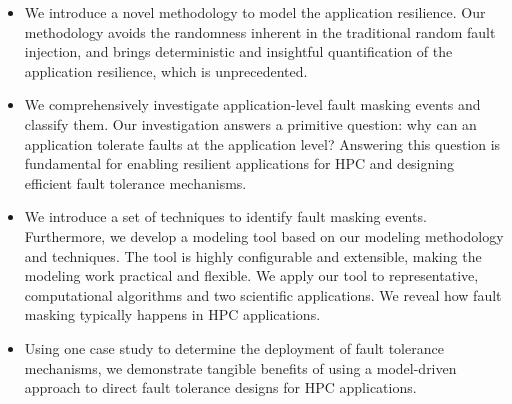 \begin{itemize}
\item
We introduce a novel methodology to model the application resilience.
Our methodology avoids the randomness inherent in the traditional random fault injection,
and brings deterministic and insightful quantification of the application resilience, which is unprecedented.


\item
We comprehensively investigate application-level fault masking events and classify them.
Our investigation answers a primitive question: why can an application tolerate faults at the application level? 
Answering this question is fundamental for enabling resilient applications for HPC and designing efficient fault tolerance mechanisms.

\item
We introduce a set of techniques to identify fault masking events. 
Furthermore, we develop a modeling tool based on our modeling methodology and techniques.
The tool is highly configurable and extensible, making the modeling work 
practical and flexible. We apply our tool to representative, computational algorithms and two scientific applications.
We reveal how fault masking typically happens in HPC applications. 

\item 
Using one case study to determine the deployment of fault tolerance mechanisms, we demonstrate tangible benefits of using a model-driven approach to direct fault tolerance designs for HPC applications.

\end{itemize}
